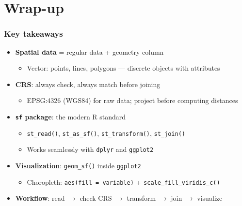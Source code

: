 \section{Wrap-up}

\begin{frame}
\frametitle{Key takeaways}
\centering

\vspace{6pt}

\begin{itemize}[<+->]
\item \textbf{Spatial data} = regular data + geometry column
  \begin{itemize}
  \item Vector: points, lines, polygons --- discrete objects with attributes
  \end{itemize}
\vspace{8pt}
\item \textbf{CRS}: always check, always match before joining
  \begin{itemize}
  \item EPSG:4326 (WGS84) for raw data; project before computing distances
  \end{itemize}
\vspace{8pt}
\item \textbf{\texttt{sf} package}: the modern R standard
  \begin{itemize}
  \item \texttt{st\_read()}, \texttt{st\_as\_sf()}, \texttt{st\_transform()}, \texttt{st\_join()}
  \item Works seamlessly with \texttt{dplyr} and \texttt{ggplot2}
  \end{itemize}
\vspace{8pt}
\item \textbf{Visualization}: \texttt{geom\_sf()} inside \texttt{ggplot2}
  \begin{itemize}
  \item Choropleth: \texttt{aes(fill = variable)} + \texttt{scale\_fill\_viridis\_c()}
  \end{itemize}
\vspace{8pt}
\item \textbf{Workflow}: read $\to$ check CRS $\to$ transform $\to$ join $\to$ visualize
\end{itemize}

\end{frame}

